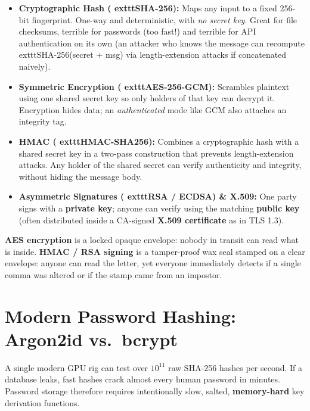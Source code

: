 \begin{itemize}[leftmargin=15pt]
  \item \textbf{Cryptographic Hash (	exttt{SHA-256}):} Maps any input to a fixed 256-bit fingerprint. One-way and deterministic, with \emph{no secret key}. Great for file checksums, terrible for passwords (too fast!) and terrible for API authentication on its own (an attacker who knows the message can recompute 	exttt{SHA-256(secret + msg)} via length-extension attacks if concatenated naively).
  \item \textbf{Symmetric Encryption (	exttt{AES-256-GCM}):} Scrambles plaintext using one shared secret key so only holders of that key can decrypt it. Encryption hides data; an \emph{authenticated} mode like GCM also attaches an integrity tag.
  \item \textbf{HMAC (	exttt{HMAC-SHA256}):} Combines a cryptographic hash with a shared secret key in a two-pass construction that prevents length-extension attacks. Any holder of the shared secret can verify authenticity and integrity, without hiding the message body.
  \item \textbf{Asymmetric Signatures (	exttt{RSA / ECDSA}) \& X.509:} One party signs with a \textbf{private key}; anyone can verify using the matching \textbf{public key} (often distributed inside a CA-signed \textbf{X.509 certificate} as in TLS 1.3).
\end{itemize}

\begin{intuitionbox}
\textbf{AES encryption} is a locked opaque envelope: nobody in transit can read what is inside. \textbf{HMAC / RSA signing} is a tamper-proof wax seal stamped on a clear envelope: anyone can read the letter, yet everyone immediately detects if a single comma was altered or if the stamp came from an impostor.
\end{intuitionbox}

\section{Modern Password Hashing: Argon2id vs.\ bcrypt}

A single modern GPU rig can test over $10^{11}$ raw SHA-256 hashes per second. If a database leaks, fast hashes crack almost every human password in minutes. Password storage therefore requires intentionally slow, salted, \textbf{memory-hard} key derivation functions.

